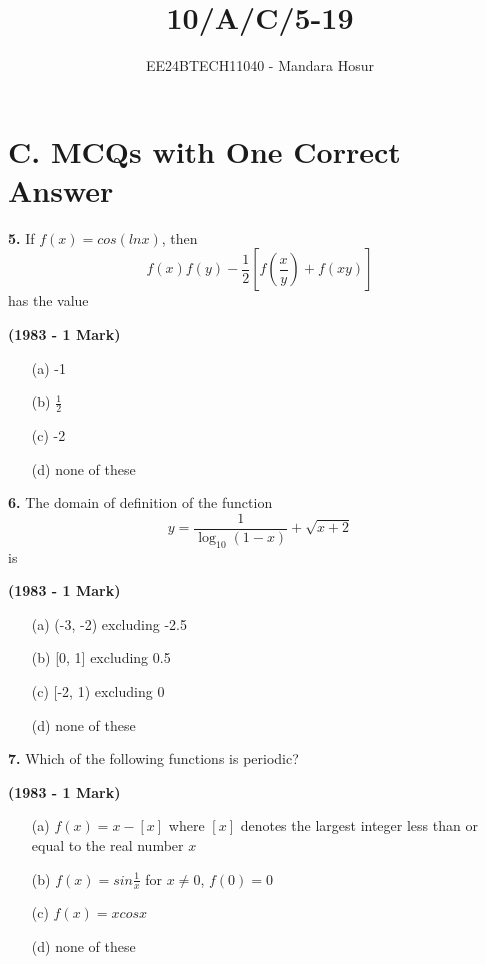 \documentclass[journal,12pt,twocolumn]{IEEEtran}
\theoremstyle{remark}
\begin{document}

\vspace{3cm}

\title{10/A/C/5-19}
\author{EE24BTECH11040 - Mandara Hosur}
\maketitle
\newpage
\bigskip

\renewcommand{\thefigure}{\theenumi}
\renewcommand{\thetable}{\theenumi}

\section*{\textbf{C. MCQs with One Correct Answer}}

\textbf{5.} If $f(x) = cos(ln x)$, then $$f(x)f(y)-\frac{1}{2} \left[f\left(\frac{x}{y}\right)+f(xy)\right]$$ has the value

\hfill{\textbf{(1983 - 1 Mark)}}

\begin{multicols}{2}
	\begin{enumerate}
		\item[(a)] -1 
		\item[(b)] $\frac{1}{2}$
		\item[(c)] -2 
		\item[(d)] none of these
	\end{enumerate}
\end{multicols}

\textbf{6.} The domain of definition of the function
$$y = \frac{1}{\log_{10}{(1-x)}} + \sqrt{x+2}$$ is

\hfill{\textbf{(1983 - 1 Mark)}}

\begin{multicols}{2}
	\begin{enumerate}
		\item[(a)] (-3, -2) excluding -2.5 
		\item[(b)] [0, 1] excluding 0.5
		\item[(c)] [-2, 1) excluding 0 
		\item[(d)] none of these
	\end{enumerate}
\end{multicols}

\textbf{7.} Which of the following functions is periodic?

\hfill{\textbf{(1983 - 1 Mark)}}

\begin{enumerate}
\item[(a)] $f(x)=x-\left[x\right]$ where $\left[x\right]$ denotes the largest integer less than or equal to the real number $x$
\item[(b)] $f(x)=sin\frac{1}{x}$ for $x\neq0$, $f(0)=0$
\item[(c)] $f(x)=xcosx$
\item[(d)] none of these
\end{enumerate}
\end{document}
